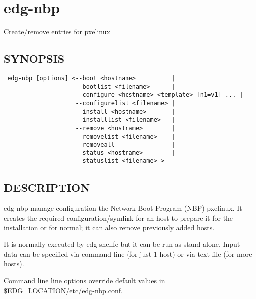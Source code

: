 \section{edg-nbp\label{edg-nbp}}


Create/remove entries for pxelinux

\subsection*{SYNOPSIS\label{edg-nbp_SYNOPSIS}}
\begin{verbatim}
 edg-nbp [options] <--boot <hostname>          |
                    --bootlist <filename>      |
                    --configure <hostname> <template> [n1=v1] ... |
                    --configurelist <filename> |
                    --install <hostname>       |
                    --installlist <filename>   |
                    --remove <hostname>        |
                    --removelist <filename>    |
                    --removeall                |
                    --status <hostname>        |
                    --statuslist <filename> >
\end{verbatim}
\subsection*{DESCRIPTION\label{edg-nbp_DESCRIPTION}}


edg-nbp manage configuration the Network Boot Program (NBP) pxelinux.
It creates the required configuration/symlink for an host to prepare it for
the installation or for normal; it can also remove previously added hosts.



It is normally executed by edg-shellfe but it can be run as stand-alone. Input data
can be specified via command line (for just 1 host) or via text file (for more hosts).



Command line line options override default values in \$EDG\_LOCATION/etc/edg-nbp.conf.

